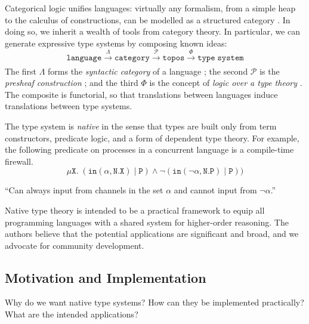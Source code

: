 \documentclass[conference]{IEEEtran}
\newcommand{\cnt}[1]{\begin{center}#1\end{center}}
\theoremstyle{definition}
\newcommand{\msc}[1]{\mathscr{#1}}
\newcommand{\mtt}[1]{\mathtt{#1}}
\newcommand{\xr}[2]{\xrightarrow[#2]{#1}}
\newcommand{\pow}{\msc{P}}
\newcommand{\N}{\mtt{N}}
\newcommand{\PP}{\mtt{P}}
\newcommand{\tti}{\mtt{in}}
\begin{document}

Categorical logic unifies languages: virtually any formalism, from a simple heap to the calculus of constructions, can be modelled as a structured category \cite{jacobs}. In doing so, we inherit a wealth of tools from category theory. In particular, we can generate expressive type systems by composing known ideas:
\[\mtt{language} \xr{\Lambda}{}  \mtt{category} \xr{\pow}{} \mtt{topos} \xr{\Phi}{} \mtt{type \; system}\]
The first $\Lambda$ forms the \textit{syntactic category} of a language \cite{lawvere}; the second $\pow$ is the \textit{presheaf construction} \cite{leinster}; and the third $\Phi$ is the concept of \textit{logic over a type theory} \cite{jacobs}. The composite is functorial, so that translations between languages induce translations between type systems.


The type system is \textit{native} in the sense that types are built only from term constructors, predicate logic, and a form of dependent type theory. For example, the following predicate on processes in a concurrent language is a compile-time firewall.
\[\mu\mtt{X}.\; (\tti(\alpha,\N.\mtt{X})\;\vert\; \PP) \land \neg(\tti(\neg\alpha,\N.\PP)\;\vert\; \PP))\]
\cnt{\footnotesize{``Can always input from channels in the set $\alpha$ and cannot input from $\neg\alpha$.''}}

Native type theory is intended to be a practical framework to equip all programming languages with a shared system for higher-order reasoning. The authors believe that the potential applications are significant and broad, and we advocate for community development.

\subsection{Motivation and Implementation}
\label{ssec:motivation}

Why do we want native type systems? How can they be implemented practically? What are the intended applications?

\end{document}
